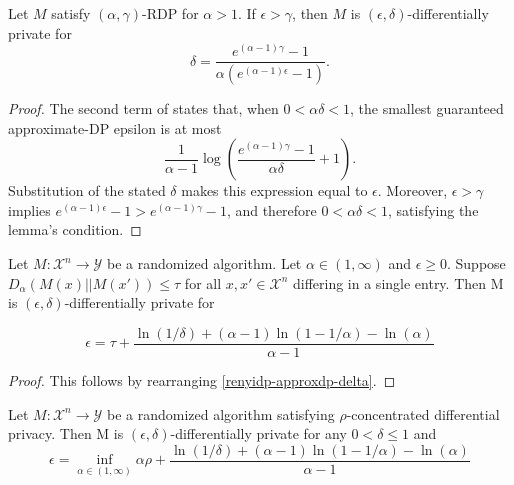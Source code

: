 \documentclass{article}
\begin{document}
\begin{theorem}
\label{asoodeh-rdp-approxdp}
\cite[Lemma 1, Equation (25)]{ALCKS21}
Let $M$ satisfy $(\alpha,\gamma)$-RDP for $\alpha>1$. If
$\epsilon>\gamma$, then $M$ is $(\epsilon,\delta)$-differentially
private for
\begin{equation}
    \delta =
    \frac{e^{(\alpha-1)\gamma}-1}
         {\alpha\left(e^{(\alpha-1)\epsilon}-1\right)}.
\end{equation}
\end{theorem}

\begin{proof}
The second term of \cite[Lemma 1, Equation (25)]{ALCKS21} states that,
when $0<\alpha\delta<1$, the smallest guaranteed approximate-DP
epsilon is at most
\begin{equation}
    \frac{1}{\alpha-1}
    \log\left(
        \frac{e^{(\alpha-1)\gamma}-1}{\alpha\delta}+1
    \right).
\end{equation}
Substitution of the stated $\delta$ makes this expression equal to
$\epsilon$. Moreover, $\epsilon>\gamma$ implies
$e^{(\alpha-1)\epsilon}-1>e^{(\alpha-1)\gamma}-1$, and therefore
$0<\alpha\delta<1$, satisfying the lemma's condition.
\end{proof}

\begin{corollary}
\label{renyidp-approxdp-epsilon}
\cite{CKS20} Let $M: \mathcal{X}^n \rightarrow \mathcal{Y}$ be a randomized algorithm. Let $\alpha \in (1, \infty)$ and $\epsilon \geq 0$. Suppose $D_\alpha(M(x) || M(x')) \leq \tau$ for all $x, x' \in \mathcal{X}^n$ differing in a single entry. Then M is $(\epsilon, \delta)$-differentially private for 

\begin{equation}
    \epsilon = \tau + \frac{\ln(1 / \delta) + (\alpha - 1) \ln(1 - 1/\alpha) - \ln(\alpha)}{\alpha - 1}
\end{equation}
\end{corollary}

\begin{proof}
This follows by rearranging \ref{renyidp-approxdp-delta}.
\end{proof}

\begin{corollary}
\label{zcdp-approxdp-epsilon}
Let $M: \mathcal{X}^n \rightarrow \mathcal{Y}$ be a randomized algorithm satisfying $\rho$-concentrated differential privacy. Then M is $(\epsilon, \delta)$-differentially private for any $0 < \delta \leq 1$ and 
\begin{equation}
    \epsilon = \inf\limits_{\alpha \in (1, \infty)} \alpha \rho + \frac{\ln(1 / \delta) + (\alpha - 1) \ln(1 - 1/\alpha) - \ln(\alpha)}{\alpha - 1}
\end{equation}
\end{corollary}
\end{document}
